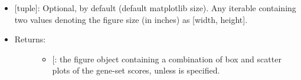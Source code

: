 \documentclass[letterpaper,10pt,english]{sphinxmanual}
\begin{document}
\begin{fulllineitems}
\begin{itemize}
\begin{description}
\begin{itemize}
\item {} 
 {[}tuple{]}: Optional,  by default (default
matplotlib size). Any iterable containing two values denoting
the figure size (in inches) as {[}width, height{]}.

\end{itemize}

\end{description}

\end{itemize}
\begin{itemize}
\item {} \begin{description}
\item[{Returns:}] \leavevmode\begin{itemize}
\item {} 
{[}\sphinxstyleemphasis{matplotlib.figure.Figure}{]}: the figure object containing a
combination of box and scatter plots of the gene-set scores,
unless  is specified.

\end{itemize}

\end{description}

\end{itemize}

\end{fulllineitems}

\end{document}
